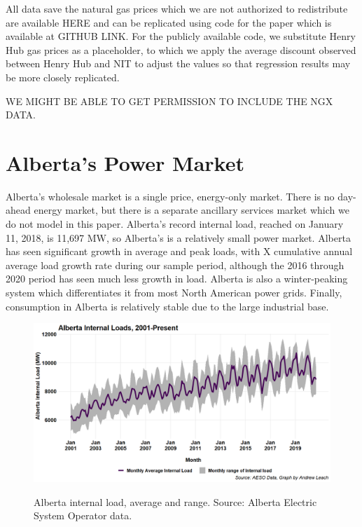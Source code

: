 \documentclass[12pt]{article}
\begin{document}
All data save the natural gas prices which we are not authorized to redistribute are available HERE and can be replicated using code for the paper which is available at GITHUB LINK. For the publicly available code, we substitute Henry Hub gas prices as a placeholder, to which we apply the average discount observed between Henry Hub and NIT to adjust the values so that regression results may be more closely replicated.

WE MIGHT BE ABLE TO GET PERMISSION TO INCLUDE THE NGX DATA.


\section{Alberta's Power Market}

Alberta's wholesale market is a single price, energy-only market. There is no day-ahead energy market, but there is a separate ancillary services market which we do not model in this paper. Alberta's record internal load, reached on January 11, 2018, is 11,697 MW, so Alberta's is a relatively small power market.  Alberta has seen significant growth in average and peak loads, with X cumulative annual average load growth rate during our sample period, although the 2016 through 2020 period has seen much less growth in load. Alberta is also a winter-peaking system which differentiates it from most North American power grids. Finally,
consumption in Alberta is relatively stable due to the large industrial base.


\begin{figure}[!h]%
	\centering \vspace{-.25cm} \includegraphics[width=6.5in]{../images/load_time.png}
\label{fig:AB load}
\vspace{-0.75cm}	\caption{Alberta internal load, average and range.  Source: Alberta Electric System Operator data.}
\end{figure}
\end{document}

